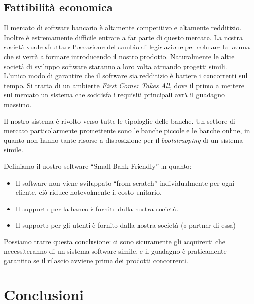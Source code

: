 \documentclass[10pt]{softeng} %
\begin{document}

\subsection{Fattibilit\`a economica}

Il mercato di software bancario \`e altamente competitivo e altamente redditizio.
Inoltre \`e estremamente difficile entrare a far parte di questo mercato.
La nostra societ\`a vuole sfruttare l'occasione del cambio di legislazione per colmare la lacuna che si verr\`a a formare introducendo il nostro prodotto.
Naturalmente le altre societ\`a di sviluppo software staranno a loro volta attuando progetti simili.
L'unico modo di garantire che il software sia redditizio \`e battere i concorrenti sul tempo.
Si tratta di un ambiente \emph{First Comer Takes All}, dove il primo a mettere sul mercato un sistema che soddisfa i requisiti principali avr\`a il guadagno massimo.

Il nostro sistema \`e rivolto verso tutte le tipologlie delle banche.
Un settore di mercato particolarmente promettente sono le banche piccole e le banche online, in quanto non hanno tante risorse a disposizione per il \emph{bootstrapping} di un sistema simile.


Definiamo il nostro software ``Small Bank Friendly'' in quanto:
\begin{itemize}
    \item Il software non viene sviluppato ``from scratch'' individualmente per ogni cliente, ci\`o riduce notevolmente il costo unitario.
    \item Il supporto per la banca \`e fornito dalla nostra societ\`a.
    \item Il supporto per gli utenti \`e fornito dalla nostra societ\`a (o partner di essa)
\end {itemize}

Possiamo trarre questa conclusione: ci sono sicuramente gli acquirenti che necessiteranno di un sistema software simile, e il guadagno \`e praticamente garantito se il rilascio avviene prima dei prodotti concorrenti.




\section{Conclusioni}
\end{document}
